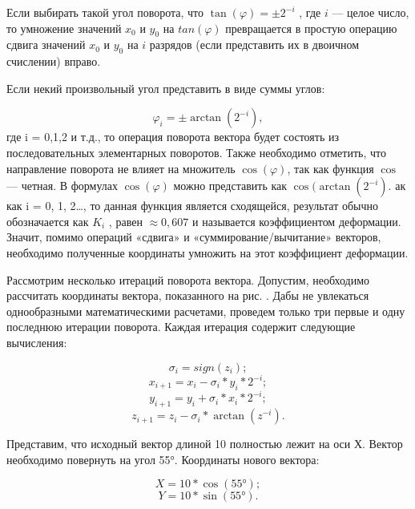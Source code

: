 \documentclass[a4paper,oneside ,10pt]{extreport}
\begin{document}
Если выбирать такой угол поворота, что \(\tan(\varphi) = \pm2^{-i}\) 
, где \(i\) — целое число, то умножение значений 
\(x_0\) и \(y_0\) на \(tan(\varphi)\) превращается в простую операцию сдвига значений \(x_0\) и \(y_0\) на \(i\) разрядов (если представить их
в двоичном счислении) вправо.

Если некий произвольный угол представить в виде суммы углов:

\begin{displaymath}	
\varphi_i = \pm\arctan(2^{-i}), 
\end{displaymath}
где i = 0,1,2 и т.д., то операция поворота вектора будет состоять
из последовательных элементарных поворотов. Также необходимо отметить, что направление поворота не влияет на множитель \(\cos(\varphi)\),
так как функция \(\cos\) — четная. В формулах \(\cos(\varphi)\) можно представить как \(\cos(\arctan(2^{-i})\). ак как i = 0, 1, 2…, то данная функция является сходящейся, результат обычно обозначается как \(K_i\)
, равен \(\approx0,607\) и называется коэффициентом деформации. Значит, помимо 
операций «сдвига» и «суммирование/вычитание» векторов, необходимо полученные 
координаты умножить на этот коэффициент 
деформации.

Рассмотрим несколько итераций поворота вектора. Допустим, необходимо рассчитать координаты вектора, показанного на рис. . Дабы не увлекаться однообразными математическими расчетами, проведем только три первые и одну последнюю итерации поворота. Каждая итерация содержит следующие вычисления:

\begin{displaymath}	
\sigma_i = sign(z_i);
\end{displaymath}
\begin{displaymath}	
x_{i+1} = x_{i} - \sigma_i*y_i*2^{-i};
\end{displaymath}
\begin{displaymath}
y_{i+1} = y_{i} + \sigma_i*x_i*2^{-i};
\end{displaymath}
\begin{displaymath}	
z_{i+1} = z_{i} - \sigma_i*\arctan(z^{-i}).
\end{displaymath}

Представим, что исходный вектор длиной 10 полностью лежит на оси Х. 
Вектор необходимо повернуть на угол 55°. Координаты нового вектора:

\begin{displaymath}
X = 10*\cos(55°);
\end{displaymath}
\begin{displaymath}	
Y = 10*\sin(55°).
\end{displaymath}
\end{document}
